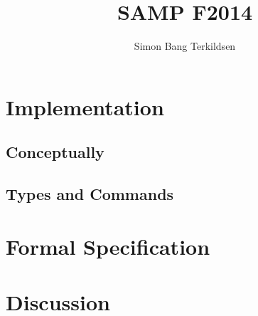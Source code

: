 \documentclass[citeauthoryear]{llncs} %
\title{SAMP F2014}
\author{Simon Bang Terkildsen}
\institute{IT University of Copenhagen}
\begin{document}
\maketitle

\begin{abstract}

\end{abstract}



\section{Implementation}

\subsection{Conceptually}




\subsection{Types and Commands}




\section{Formal Specification}



\section{Discussion}






\end{document}
